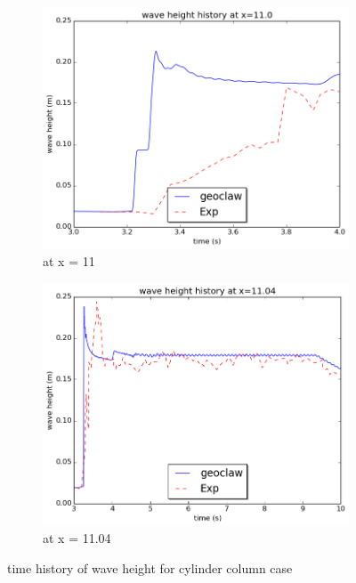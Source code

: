 \documentclass[11pt]{article}
\begin{document}
\begin{figure}[h!]
    \centering
    \begin{subfigure}[b]{0.4\textwidth}
        \includegraphics[width=1\textwidth]{./plots/waveheight_cylinder_x11}
        \caption{at x = 11}
        \label{fig:waveheight_cylinder_x=11.0}
    \end{subfigure}
    \begin{subfigure}[b]{0.4\textwidth}
        \includegraphics[width=1\textwidth]{./plots/waveheight_cylinder_x1104_largerTimeScale}
        \caption{at x = 11.04}
        \label{fig:waveheight_cylinder_x=11.04}
    \end{subfigure}
    \caption{time history of wave height for cylinder column case}
\end{figure}
\end{document}
